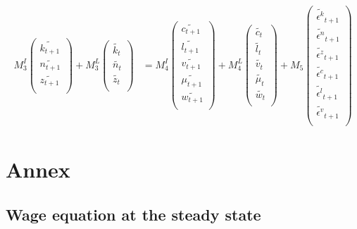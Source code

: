 \documentclass[english]{article}
\begin{document}
\begin{align}
  M_3^{I}\begin{pmatrix}
    \widetilde{k_{t+1}} \\
    \widetilde{n_{t+1}} \\
    \widetilde{z_{t+1}} \\
  \end{pmatrix} +
M_3^{L}\begin{pmatrix}
  \widetilde{k_{t}} \\
  \widetilde{n_{t}} \\
  \widetilde{z_{t}} \\
\end{pmatrix}
&= M_4^{I}\begin{pmatrix}
  \widetilde{c_{t+1}} \\
  \widetilde{l_{t+1}} \\
  \widetilde{v_{t+1}} \\
  \widetilde{\mu_{t+1}} \\
  \widetilde{w_{t+1}} \\
\end{pmatrix} 
+ M_4^{L}\begin{pmatrix}
  \widetilde{c_{t}} \\
  \widetilde{l_{t}} \\
  \widetilde{v_{t}} \\
  \widetilde{\mu_{t}} \\
  \widetilde{w_{t}} \\
\end{pmatrix}
+M_5 \begin{pmatrix}
  \widetilde{\epsilon^{k}}_{t+1} \\
  \widetilde{\epsilon^{n}}_{t+1} \\
  \widetilde{\epsilon^{z}}_{t+1} \\
  \widetilde{\epsilon^{c}}_{t+1} \\
  \widetilde{\epsilon^{l}}_{t+1} \\
  \widetilde{\epsilon^{v}}_{t+1} \\
\end{pmatrix}
\end{align}



\newpage

\section*{Annex}
\label{Annex}
\subsection*{Wage equation at the steady state}
\label{subsec:annexI}
\end{document}
